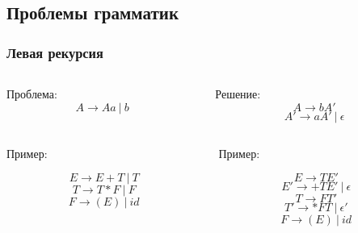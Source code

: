 \documentclass[xetex,mathserif,serif]{beamer}
\begin{document}
    \subsection{Проблемы грамматик}

    \begin{frame}
        \frametitle{Левая рекурсия}
        \begin{columns}[t]
            \begin{column}{0.5\textwidth}
                Проблема:
                $$A \rightarrow Aa\ |\ b$$
            \end{column}
            \begin{column}{0.5\textwidth}
                Решение: 
                $$A \rightarrow bA'$$
                $$A' \rightarrow aA'\ |\ \epsilon$$
            \end{column}
        \end{columns}
        \begin{columns}[t]
            \begin{column}{0.5\textwidth}
                Пример:
                
                $$E \rightarrow E + T\ |\ T$$
                $$T \rightarrow T * F\ |\ F$$
                $$F \rightarrow (E)\ |\ id$$
            \end{column}
            \begin{column}{0.5\textwidth}
                Пример:

                $$E \rightarrow TE'$$
                $$E' \rightarrow +TE'\ |\ \epsilon$$
                $$T \rightarrow FT'$$
                $$T' \rightarrow *FT\ |\ \epsilon'$$
                $$F \rightarrow (E)\ |\ id$$
            \end{column}
        \end{columns}
    \end{frame}
\end{document}
